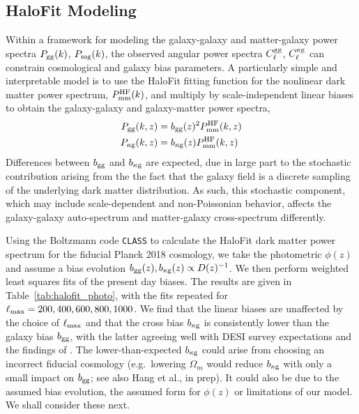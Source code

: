 \documentclass[a4paper,usenatbib]{mnras}
\begin{document}
\subsection{HaloFit Modeling}\label{sec:results/halofit}

Within a framework for modeling the galaxy-galaxy and matter-galaxy power spectra $P_{\rm gg}(k)$, $P_{\rm mg}(k)$, the observed angular power spectra $C_{\ell}^{\rm gg}$, $C_{\ell}^{\rm \kappa g}$ can constrain cosmological and galaxy bias parameters. A particularly simple and interpretable model is to use the HaloFit \citep{Smith++03} fitting function for the nonlinear dark matter power spectrum, $P_{\rm mm}^{\rm HF}(k)$, and multiply by scale-independent linear biases to obtain the galaxy-galaxy and galaxy-matter power spectra,
\begin{align}
    P_{\rm gg}(k,z) &= b_{\rm gg}(z)^2 P_{\rm mm}^{\rm HF}(k,z) \\
    P_{\rm \kappa g}(k,z) &= b_{\rm \kappa g}(z) P_{\rm mm}^{\rm HF}(k,z)
\end{align}
Differences between $b_{\rm gg}$ and $b_{\rm \kappa g}$ are expected, due in large part to the stochastic contribution arising from the the fact that the galaxy field is a discrete sampling of the underlying dark matter distribution. As such, this stochastic component, which may include scale-dependent and non-Poissonian behavior, affects the galaxy-galaxy auto-spectrum and matter-galaxy cross-spectrum differently.

Using the Boltzmann code \texttt{CLASS} \citep{Blas++11} to calculate the HaloFit dark matter power spectrum for the fiducial Planck 2018 cosmology, we take the photometric $\phi(z)$ and assume a bias evolution $b_{\rm gg}(z), b_{\rm \kappa g}(z) \propto D(z)^{-1}$. We then perform weighted least squares fits of the present day biases. The results are given in Table~\ref{tab:halofit_photo}, with the fits repeated for $\ell_{\rm max} = 200, 400, 600, 800, 1000$. We find that the linear biases are unaffected by the choice of $\ell_{\rm max}$ and that the cross bias $b_{\rm \kappa g}$ is consistently lower than the galaxy bias $b_{\rm gg}$, with the latter agreeing well with DESI survey expectations and the findings of \citealt{Kitanidis++19}.  The lower-than-expected $b_{\rm \kappa g}$ could arise from choosing an incorrect fiducial cosmology (e.g.\ lowering $\Omega_m$ would reduce $b_{\rm \kappa g}$ with only a small impact on $b_{\rm gg}$; see also Hang et al., in prep).  It could also be due to the assumed bias evolution, the assumed form for $\phi(z)$ or limitations of our model.  We shall consider these next.
\end{document}
